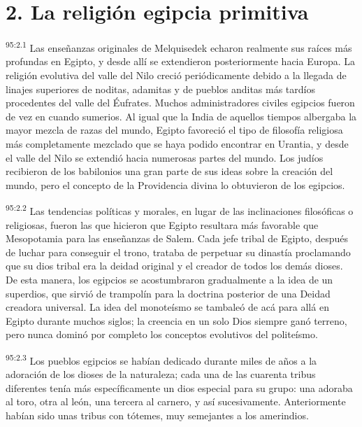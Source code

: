 \section*{2. La religión egipcia primitiva}
\par
\textsuperscript{95:2.1} Las enseñanzas originales de Melquisedek echaron realmente sus raíces más profundas en Egipto, y desde allí se extendieron posteriormente hacia Europa. La religión evolutiva del valle del Nilo creció periódicamente debido a la llegada de linajes superiores de noditas, adamitas y de pueblos anditas más tardíos procedentes del valle del Éufrates. Muchos administradores civiles egipcios fueron de vez en cuando sumerios. Al igual que la India de aquellos tiempos albergaba la mayor mezcla de razas del mundo, Egipto favoreció el tipo de filosofía religiosa más completamente mezclado que se haya podido encontrar en Urantia, y desde el valle del Nilo se extendió hacia numerosas partes del mundo. Los judíos recibieron de los babilonios una gran parte de sus ideas sobre la creación del mundo, pero el concepto de la Providencia divina lo obtuvieron de los egipcios.

\par
\textsuperscript{95:2.2} Las tendencias políticas y morales, en lugar de las inclinaciones filosóficas o religiosas, fueron las que hicieron que Egipto resultara más favorable que Mesopotamia para las enseñanzas de Salem. Cada jefe tribal de Egipto, después de luchar para conseguir el trono, trataba de perpetuar su dinastía proclamando que su dios tribal era la deidad original y el creador de todos los demás dioses. De esta manera, los egipcios se acostumbraron gradualmente a la idea de un superdios, que sirvió de trampolín para la doctrina posterior de una Deidad creadora universal. La idea del monoteísmo se tambaleó de acá para allá en Egipto durante muchos siglos; la creencia en un solo Dios siempre ganó terreno, pero nunca dominó por completo los conceptos evolutivos del politeísmo.

\par
\textsuperscript{95:2.3} Los pueblos egipcios se habían dedicado durante miles de años a la adoración de los dioses de la naturaleza; cada una de las cuarenta tribus diferentes tenía más específicamente un dios especial para su grupo: una adoraba al toro, otra al león, una tercera al carnero, y así sucesivamente. Anteriormente habían sido unas tribus con tótemes, muy semejantes a los amerindios.

